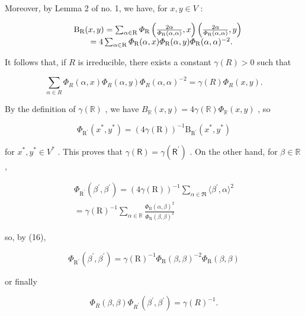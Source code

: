 Moreover, by Lemma 2 of no. 1, we have, for \(x, y \in V\) :

\[
\begin{array}{r l} & {\mathrm{B} _ {\mathrm{R}} (x, y) = \sum_ {\alpha \in \mathrm{R}} \varPhi_ {\mathrm{R}} \left(\frac {2 \alpha}{\varPhi_ {\mathrm{R}} (\alpha , \alpha)}, x\right) \left(\frac {2 \alpha}{\varPhi_ {\mathrm{R}} (\alpha , \alpha)}, y\right)} \\ & {\qquad = 4 \sum_ {\alpha \in \mathrm{R}} \varPhi_ {\mathrm{R}} (\alpha , x) \varPhi_ {\mathrm{R}} (\alpha , y) \varPhi_ {\mathrm{R}} (\alpha , \alpha) ^ {- 2}.} \end{array}
\]

It follows that, if \(R\) is irreducible, there exists a constant \(\gamma(R) > 0\) such that

\[
\sum_ {\alpha \in R} \Phi_ {R} (\alpha , x) \Phi_ {R} (\alpha , y) \Phi_ {R} (\alpha , \alpha) ^ {- 2} = \gamma (R) \Phi_ {R} (x, y).\tag{18}
\]

By the definition of \(\gamma (\mathbb{R})\) , we have \(B_{\mathbb{R}}(x,y) = 4\gamma (\mathbb{R})\Phi_{\mathbb{R}}(x,y)\) , so

\[
\Phi_ {\mathrm{R} ^ {\prime}} \left(x ^ {*}, y ^ {*}\right) = (4 \gamma (\mathrm{R})) ^ {- 1} \mathrm{B} _ {\mathrm{R} ^ {\prime}} \left(x ^ {*}, y ^ {*}\right)
\]

for \(x^{*},y^{*}\in V^{*}\) . This proves that \(\gamma (\mathsf{R}) = \gamma (\mathsf{R}^{\prime})\) . On the other hand, for \(\beta \in \mathbb{R}\) ,

\[
\begin{array}{c} \Phi_ {\mathrm{R} ^ {\prime}} (\beta^ {\prime}, \beta^ {\prime}) = (4 \gamma (\mathrm{R})) ^ {- 1} \sum_ {\alpha \in \mathfrak {R}} \langle \beta^ {\prime}, \alpha \rangle^ {2} \\ = \gamma (\mathrm{R}) ^ {- 1} \sum_ {\alpha \in \mathbb {R}} \frac {\Phi_ {\mathrm{R}} (\alpha , \beta) ^ {2}}{\Phi_ {\mathrm{R}} (\beta , \beta) ^ {2}} \end{array}
\]

so, by (16),

\[
\Phi_ {\mathrm{R} ^ {\prime}} (\beta^ {\prime}, \beta^ {\prime}) = \gamma (\mathrm{R}) ^ {- 1} \Phi_ {\mathrm{R}} (\beta , \beta) ^ {- 2} \Phi_ {\mathrm{R}} (\beta , \beta)
\]

or finally

\[
\Phi_ {R} (\beta , \beta) \Phi_ {R ^ {\prime}} (\beta^ {\prime}, \beta^ {\prime}) = \gamma (R) ^ {- 1}.\tag{19}
\]

